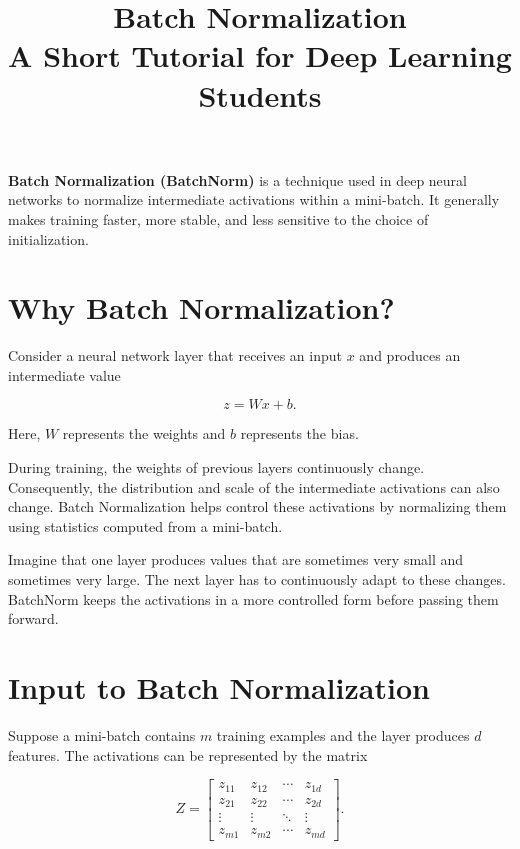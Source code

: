 \documentclass[11pt,a4paper]{article}
\title{
	\vspace{-1cm}
	\textbf{\color{titleblue}Batch Normalization}\\[4pt]
	\large A Short Tutorial for Deep Learning Students
}
\author{}
\date{}
\begin{document}
	
	\maketitle
	
	\begin{keyidea}
		\textbf{Batch Normalization (BatchNorm)} is a technique used in deep
		neural networks to normalize intermediate activations within a mini-batch.
		It generally makes training faster, more stable, and less sensitive to
		the choice of initialization.
	\end{keyidea}
	
	\section{Why Batch Normalization?}
	
	Consider a neural network layer that receives an input $x$ and produces
	an intermediate value
	
	\begin{equation}
		z = Wx+b.
	\end{equation}
	
	Here, $W$ represents the weights and $b$ represents the bias.
	
	During training, the weights of previous layers continuously change.
	Consequently, the distribution and scale of the intermediate activations
	can also change. Batch Normalization helps control these activations by
	normalizing them using statistics computed from a mini-batch.
	
	\begin{intuition}
		Imagine that one layer produces values that are sometimes very small and
		sometimes very large. The next layer has to continuously adapt to these
		changes. BatchNorm keeps the activations in a more controlled form before
		passing them forward.
	\end{intuition}
	
	\section{Input to Batch Normalization}
	
	Suppose a mini-batch contains $m$ training examples and the layer produces
	$d$ features. The activations can be represented by the matrix
	
	\begin{equation}
		Z =
		\begin{bmatrix}
			z_{11} & z_{12} & \cdots & z_{1d}\\
			z_{21} & z_{22} & \cdots & z_{2d}\\
			\vdots & \vdots & \ddots & \vdots\\
			z_{m1} & z_{m2} & \cdots & z_{md}
		\end{bmatrix}.
	\end{equation}
	
\end{document}
